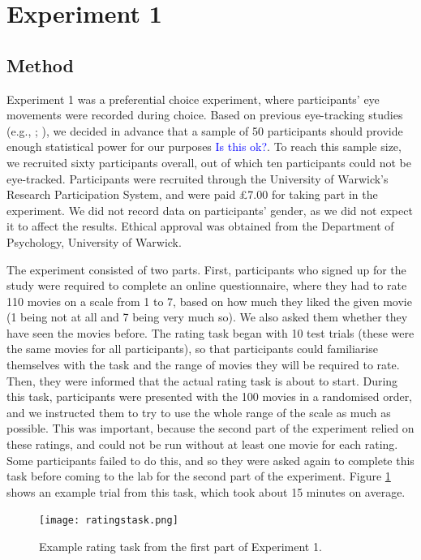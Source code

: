 \documentclass[11pt,a4paper]{article}
\newcommand{\AT}[1] {{\textcolor{blue}{#1}}}
\begin{document}
\section{Experiment 1}

\subsection{Method} \label{chap1exp1method}

Experiment 1 was a preferential choice experiment, where participants' eye movements were recorded during choice. Based on previous eye-tracking studies (e.g., ; ), we decided in advance that a sample of 50 participants should provide enough statistical power for our purposes \AT{Is this ok?}. To reach this sample size, we recruited sixty participants overall, out of which ten participants could not be eye-tracked. Participants were recruited through the University of Warwick's Research Participation System, and were paid £7.00 for taking part in the experiment. We did not record data on participants' gender, as we did not expect it to affect the results. Ethical approval was obtained from the Department of Psychology, University of Warwick.

The experiment consisted of two parts. First, participants who signed up for the study were required to complete an online questionnaire, where they had to rate 110 movies on a scale from 1 to 7, based on how much they liked the given movie (1 being not at all and 7 being very much so). We also asked them whether they have seen the movies before. The rating task began with 10 test trials (these were the same movies for all participants), so that participants could familiarise themselves with the task and the range of movies they will be required to rate. Then, they were informed that the actual rating task is about to start. During this task, participants were presented with the 100 movies in a randomised order, and we instructed them to try to use the whole range of the scale as much as possible. This was important, because the second part of the experiment relied on these ratings, and could not be run without at least one movie for each rating. Some participants failed to do this, and so they were asked again to complete this task before coming to the lab for the second part of the experiment. Figure \ref{fig:ratingstask} shows an example trial from this task, which took about 15 minutes on average. 

\begin{figure}[htb!]
\captionsetup{justification=centering}
\centering
\caption{Example rating task from the first part of Experiment 1. }
\texttt{[image: ratingstask.png]}
\label{fig:ratingstask}
\end{figure}
\end{document}
